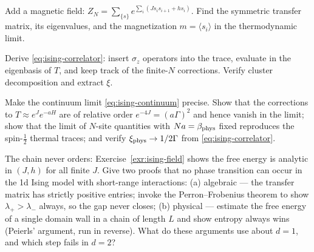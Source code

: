 \begin{exercise}[easy]
\label{exr:ising-field}
Add a magnetic field: $Z_N = \sum_{\{s\}} e^{\sum_i (J s_i s_{i+1} + h s_i)}$.
Find the symmetric transfer matrix, its eigenvalues, and the magnetization $m =
\langle s_i \rangle$ in the thermodynamic limit.
\end{exercise}

\begin{exercise}[classic]
\label{exr:ising-correlator}
Derive \eqref{eq:ising-correlator}: insert $\sigma_z$ operators into the trace,
evaluate in the eigenbasis of $T$, and keep track of the finite-$N$ corrections.
Verify cluster decomposition and extract $\xi$.
\end{exercise}

\begin{exercise}[medium]
\label{exr:ising-continuum}
Make the continuum limit \eqref{eq:ising-continuum} precise. Show that the
corrections to $T \approx e^{J} e^{-aH}$ are of relative order $e^{-4J} =
(a\Gamma)^2$ and hence vanish in the limit; show that the limit of $N$-site
quantities with $Na = \beta_{\rm phys}$ fixed reproduces the spin-$\tfrac12$
thermal traces; and verify $\xi_{\rm phys} \to 1/2\Gamma$ from
\eqref{eq:ising-correlator}.
\end{exercise}

\begin{exercise}[thinker]
\label{exr:no-transition}
The chain never orders: Exercise~\ref{exr:ising-field} shows the free energy is
analytic in $(J, h)$ for all finite $J$. Give two proofs that no phase
transition can occur in the 1d Ising model with short-range interactions: (a)
algebraic --- the transfer matrix has strictly positive entries; invoke the
Perron--Frobenius theorem to show $\lambda_+ > \lambda_-$ always, so the gap
never closes; (b) physical --- estimate the free energy of a single domain wall
in a chain of length $L$ and show entropy always wins (Peierls' argument, run in
reverse). What do these arguments use about $d = 1$, and which step fails in $d
= 2$?
\end{exercise}

